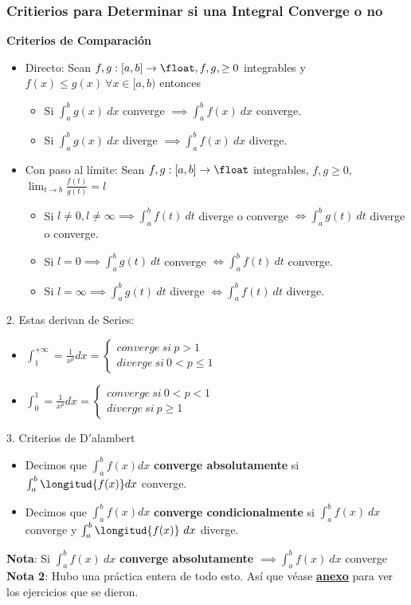 \documentclass[10pt,a4paper]{article}
\begin{document}
\subsubsection*{Critierios para Determinar si una Integral Converge o no}
\label{subsubsection:series_convergencia}
\textbf{Criterios de Comparación} \begin{itemize}
    \item Directo: Sean $f, g: [a,b] \rightarrow \float, f, g, \ge 0$ integrables y $f(x) \le g(x) \ \forall x \in [a, b)$ entonces 
    \begin{itemize}
        \item Si $\int^{b}_{a} g(x) \ dx$ converge $ \implies \int^{b}_{a}f(x) \ dx$ converge.
        \item  Si $\int^{b}_{a} g(x) \ dx$ diverge  $\implies \int^{b}_{a}f(x) \ dx$ diverge.
    \end{itemize}
    \item Con paso al límite: Sean $f, g: [a,b] \rightarrow \float$ integrables, $f,g \ge 0$, $\lim_{t \to b} \frac{f(t)}{g(t)} = l$
    \begin{itemize}
        \item Si $l \neq 0, l \neq \infty \implies \int^{b}_{a}f(t) \ dt$ diverge o converge $\iff \int^{b}_{a}g(t) \ dt$ diverge o converge.
        \item Si $l = 0 \implies \int^{b}_{a}g(t) \ dt$ converge $\iff \int^{b}_{a} f(t) \ dt$ converge.
        \item Si $l = \infty \implies \int^{b}_{a}g(t) \ dt$ diverge $\iff \int^{b}_{a} f(t) \ dt$ diverge.
    \end{itemize}
\end{itemize}
2. Estas derivan de Series: 
\begin{itemize}
    \item $\int^{+\infty}_{1} = \frac{1}{x^{p}} dx = \begin{cases}
        converge \ si \ p > 1 \\
        diverge \ si \ 0 <p \le 1
    \end{cases}$
    \item $\int^{1}_{0} = \frac{1}{x^{p}} dx = \begin{cases}
        converge \ si \ 0 < p < 1 \\
        diverge \ si \ p \ge 1
    \end{cases}$
\end{itemize} 
3. Criterios de D$'$alambert 
\begin{itemize}
    \item Decimos que $\int^{b}_{a}f(x) dx$ \textbf{converge absolutamente} si $\int^{b}_{a}\longitud{f(x)}dx$ converge.
    \item Decimos que $\int^{b}_{a}f(x) dx$ \textbf{converge condicionalmente} si $\int^{b}_{a}f(x) \ dx$ converge y $\int^{b}_{a}\longitud{f(x)} \ dx$ diverge.
\end{itemize}
\textbf{Nota}: Si $ \int^{b}_{a}f(x) \ dx$ \textbf{converge absolutamente} $ \implies \int^{b}_{a}f(x) \ dx$ converge \\
\textbf{Nota 2}: Hubo una práctica entera de todo esto. Así que véase \hyperref[subsec:integrales_impropias_convergencia]{\textbf{\underline{anexo}}} para ver los ejercicios que se dieron. 
\end{document}
